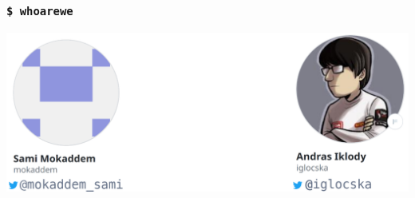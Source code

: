 
\begin{frame}[t,plain]
\titlepage
\end{frame}

\begin{frame}
    \frametitle{\texttt{\$ whoarewe}}
    \begin{center}
        \includegraphics[width=0.3\linewidth]{pictures/whoarewe.png}
        \hspace{1em}
    \end{center}
\end{frame}

\begin{frame}
    \frametitle{}

\end{frame}

